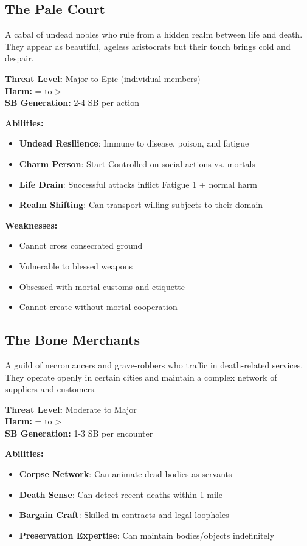 \documentclass[12pt]{article}
\begin{document}
\begin{itemize}
\subsection*{The Pale Court}

A cabal of undead nobles who rule from a hidden realm between life and death. They appear as beautiful, ageless aristocrats but their touch brings cold and despair.

\textbf{Threat Level:} Major to Epic (individual members) \\
\textbf{Harm:} = to > \\
\textbf{SB Generation:} 2-4 SB per action

\textbf{Abilities:}
\begin{itemize}
\item \textbf{Undead Resilience}: Immune to disease, poison, and fatigue
\item \textbf{Charm Person}: Start Controlled on social actions vs. mortals
\item \textbf{Life Drain}: Successful attacks inflict Fatigue 1 + normal harm
\item \textbf{Realm Shifting}: Can transport willing subjects to their domain
\end{itemize}

\textbf{Weaknesses:}
\begin{itemize}
\item Cannot cross consecrated ground
\item Vulnerable to blessed weapons
\item Obsessed with mortal customs and etiquette
\item Cannot create without mortal cooperation
\end{itemize}

\subsection*{The Bone Merchants}

A guild of necromancers and grave-robbers who traffic in death-related services. They operate openly in certain cities and maintain a complex network of suppliers and customers.

\textbf{Threat Level:} Moderate to Major \\
\textbf{Harm:} = to > \\
\textbf{SB Generation:} 1-3 SB per encounter

\textbf{Abilities:}
\begin{itemize}
\item \textbf{Corpse Network}: Can animate dead bodies as servants
\item \textbf{Death Sense}: Can detect recent deaths within 1 mile
\item \textbf{Bargain Craft}: Skilled in contracts and legal loopholes
\item \textbf{Preservation Expertise}: Can maintain bodies/objects indefinitely
\end{itemize}


\end{itemize}
\end{document}
